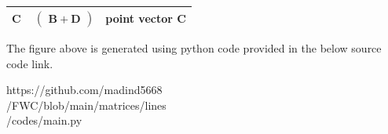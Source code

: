 \documentclass[a4paper,12pt]{report}
\let\vec\mathbf
\begin{document}
\begin{multicols}{2}
\begin{center}
\begin{tabular}{|c|c|c|}
	\large\textbf{C} & $\ \begin{pmatrix} \vec{B+D} \end{pmatrix}$ & \large point vector C\\ 
      \hline
   \end{tabular}
 \end{center}\vspace{5mm} 
\raggedright\large{The figure above is generated using python code provided in the below source code link.}\vspace{2mm}\\
\begin{mdframed}
\raggedright\large{https://github.com/madind5668 \\ /FWC/blob/main/matrices/lines\\ /codes/main.py}
\end{mdframed}
\end{multicols}
\end{document}
